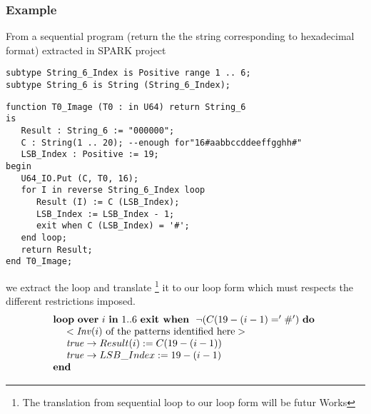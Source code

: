 \documentclass[a4paper,10pt]{article}
\newcommand{\idx}{\ensuremath{i}\xspace}
\newcommand{\KWloop}{\ensuremath{\mathrm{\textbf{loop}}~}}
\newcommand{\KWdo}{\ensuremath{\mathrm{\textbf{do}}~}}
\newcommand{\KWend}{\ensuremath{\mathrm{\textbf{end}}~}}
\newcommand{\KWover}{\ensuremath{\mathrm{\textbf{over}}~}}
\newcommand{\KWin}{\ensuremath{~\mathrm{\textbf{in}}~}}
\newcommand{\KWexit}{\ensuremath{\mathrm{\textbf{exit when}}~}}
\newcommand{\Inv}[1]{\ensuremath{\mathit{Inv}(#1)\xspace}}
\begin{document}
\subsubsection*{Example}
From a sequential program (return the the string corresponding to hexadecimal format) 
extracted in SPARK project ~\cite{sparkskein:url} 
\begin{lstlisting}
subtype String_6_Index is Positive range 1 .. 6;
subtype String_6 is String (String_6_Index);
\end{lstlisting}

\begin{lstlisting}
function T0_Image (T0 : in U64) return String_6
is
   Result : String_6 := "000000";
   C : String(1 .. 20); --enough for"16#aabbccddeeffgghh#"
   LSB_Index : Positive := 19;
begin
   U64_IO.Put (C, T0, 16);
   for I in reverse String_6_Index loop
      Result (I) := C (LSB_Index);
      LSB_Index := LSB_Index - 1;
      exit when C (LSB_Index) = '#';
   end loop;
   return Result;
end T0_Image;
\end{lstlisting}

we extract the loop and translate \footnote{The translation from sequential loop to our 
loop form will be futur Works} it to our loop form which must respects the different 
restrictions imposed.
$$\begin{array}{l}
  \KWloop \KWover \idx \KWin 1 .. 6 ~ \KWexit ~ \neg (C (19-(\idx-1) = '\#') ~ \KWdo \\
  ~~~~ < \textrm{\Inv{\idx} of the patterns identified here} >\\
  ~~~~ \mathit{true} \rightarrow Result (\idx) := C (19-(\idx-1))\\
  ~~~~ \mathit{true} \rightarrow LSB\_Index := 19 - (\idx-1)\\
  \KWend
\end{array}$$
\fi



\end{document}
